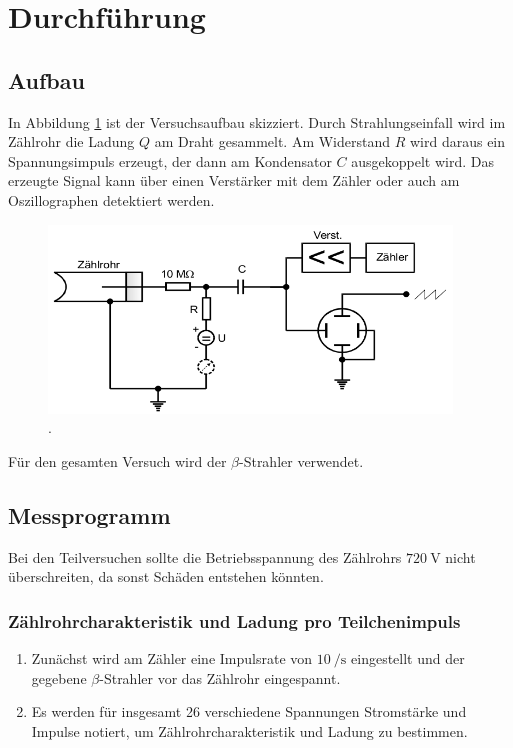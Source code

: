 \section{Durchführung}
\label{sec:Durchführung}

\subsection{Aufbau}

In Abbildung \ref{fig:VA} ist der Versuchsaufbau skizziert.
Durch Strahlungseinfall wird im Zählrohr die Ladung $Q$ am Draht gesammelt.
Am Widerstand $R$ wird daraus ein Spannungsimpuls erzeugt, der dann am
Kondensator $C$ ausgekoppelt wird. Das erzeugte Signal kann über einen
Verstärker mit dem Zähler oder auch am Oszillographen detektiert werden.

\begin{figure}
  \centering
  \includegraphics[height=5cm]{MeinePics;)/VA.png}
  \caption{.\cite{anleitung}}
  \label{fig:VA}
\end{figure}

Für den gesamten Versuch wird der $\beta$-Strahler  verwendet.

\subsection{Messprogramm}

Bei den Teilversuchen sollte die Betriebsspannung des Zählrohrs
$\SI{720}{\volt}$ nicht überschreiten, da sonst Schäden entstehen könnten.

\subsubsection{Zählrohrcharakteristik und Ladung pro Teilchenimpuls}
\begin{enumerate}
  \item Zunächst wird am Zähler eine Impulsrate von $\SI{10}{\per\second}$ eingestellt
  und der gegebene $\beta$-Strahler vor das Zählrohr eingespannt.
  \item Es werden für insgesamt 26 verschiedene Spannungen Stromstärke und
  Impulse notiert, um Zählrohrcharakteristik und Ladung zu bestimmen.
\end{enumerate}

